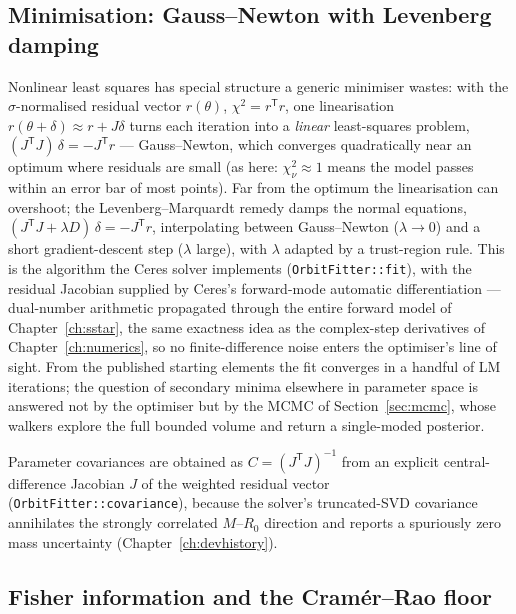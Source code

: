 \subsection{Minimisation: Gauss--Newton with Levenberg damping}

Nonlinear least squares has special structure a generic minimiser
wastes: with the $\sigma$-normalised residual vector $r(\theta)$,
$\chi^2 = r^{\mathsf T}r$, one linearisation
$r(\theta + \delta) \approx r + J\delta$ turns each iteration into a
\emph{linear} least-squares problem,
$(J^{\mathsf T}J)\,\delta = -J^{\mathsf T}r$ — Gauss--Newton, which
converges quadratically near an optimum where residuals are small (as
here: $\chi^2_\nu \approx 1$ means the model passes within an error
bar of most points). Far from the optimum the linearisation can
overshoot; the Levenberg--Marquardt remedy damps the normal equations,
$(J^{\mathsf T}J + \lambda D)\,\delta = -J^{\mathsf T}r$,
interpolating between Gauss--Newton ($\lambda \to 0$) and a short
gradient-descent step ($\lambda$ large), with $\lambda$ adapted by a
trust-region rule. This is the algorithm the Ceres solver implements
(\texttt{OrbitFitter::fit}), with the residual Jacobian supplied by
Ceres's forward-mode automatic differentiation — dual-number
arithmetic propagated through the entire forward model of
Chapter~\ref{ch:sstar}, the same exactness idea as the complex-step
derivatives of Chapter~\ref{ch:numerics}, so no finite-difference
noise enters the optimiser's line of sight. From the published
starting elements the fit converges in a handful of LM iterations;
the question of secondary minima elsewhere in parameter space is
answered not by the optimiser but by the MCMC of
Section~\ref{sec:mcmc}, whose walkers explore the full bounded volume
and return a single-moded posterior.

Parameter covariances are obtained as
$C = (J^{\mathsf T} J)^{-1}$ from an explicit central-difference Jacobian
$J$ of the weighted residual vector (\texttt{OrbitFitter::covariance}),
because the solver's truncated-SVD
covariance annihilates the strongly correlated $M$--$R_0$ direction and
reports a spuriously zero mass uncertainty
(Chapter~\ref{ch:devhistory}).

\subsection{Fisher information and the Cram\'er--Rao floor}
\label{sec:fisher}

